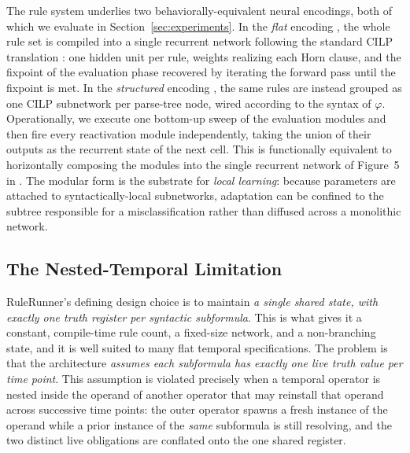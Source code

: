 The rule system underlies two behaviorally-equivalent neural encodings, both of which we evaluate in Section~\ref{sec:experiments}. In the \emph{flat} encoding \cite{perotti2014neural}, the whole rule set is compiled into a single recurrent network following the standard CILP translation \cite{}: one hidden unit per rule, weights realizing each Horn clause, and the fixpoint of the evaluation phase recovered by iterating the forward pass until the fixpoint is met. 
In the \emph{structured} encoding \cite{perotti2015neural}, the same rules are instead grouped as one CILP subnetwork per parse-tree node, wired according to the syntax of $\varphi$. Operationally, we execute one bottom-up sweep of the evaluation modules and then fire every reactivation module independently, taking the union of their outputs as the recurrent state of the next cell. This is functionally equivalent to horizontally composing the modules into the single recurrent network of Figure~5 in \cite{perotti2015neural}. The modular form is the substrate for \emph{local learning}: because parameters are attached to syntactically-local subnetworks, adaptation can be confined to the subtree responsible for a misclassification rather than diffused across a monolithic network.


\subsection{The Nested-Temporal Limitation}
\label{sec:rulerunner-limitation}

RuleRunner's defining design choice is to maintain \emph{a single shared state, with exactly one truth register per syntactic subformula}. This is what gives it a constant, compile-time rule count, a fixed-size network, and a non-branching state, and it is well suited to many flat temporal specifications. The problem is that the architecture \emph{assumes each subformula has exactly one live truth value per time point}. This assumption is violated precisely when a temporal operator is nested inside the operand of another operator that may reinstall that operand across successive time points: the outer operator spawns a fresh instance of the operand while a prior instance of the \emph{same} subformula is still resolving, and the two distinct live obligations are conflated onto the one shared register.

